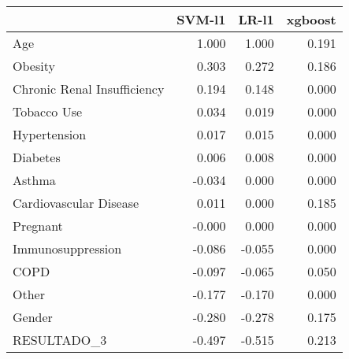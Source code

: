 \begin{tabular}{lrrr}
\toprule
{} &  SVM-l1 &  LR-l1 &  xgboost \\
\midrule
Age                         &   1.000 &  1.000 &    0.191 \\
Obesity                     &   0.303 &  0.272 &    0.186 \\
Chronic Renal Insufficiency &   0.194 &  0.148 &    0.000 \\
Tobacco Use                 &   0.034 &  0.019 &    0.000 \\
Hypertension                &   0.017 &  0.015 &    0.000 \\
Diabetes                    &   0.006 &  0.008 &    0.000 \\
Asthma                      &  -0.034 &  0.000 &    0.000 \\
Cardiovascular Disease      &   0.011 &  0.000 &    0.185 \\
Pregnant                    &  -0.000 &  0.000 &    0.000 \\
Immunosuppression           &  -0.086 & -0.055 &    0.000 \\
COPD                        &  -0.097 & -0.065 &    0.050 \\
Other                       &  -0.177 & -0.170 &    0.000 \\
Gender                      &  -0.280 & -0.278 &    0.175 \\
RESULTADO\_3                 &  -0.497 & -0.515 &    0.213 \\
\bottomrule
\end{tabular}
